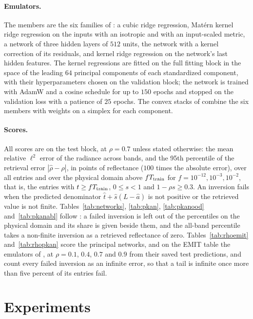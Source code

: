 \documentclass[11pt]{article}
\theoremstyle{remark}
\newcommand{\1}{\mathbf{1}}
\begin{document}
\paragraph{Emulators.} The members are the six families of \cite{shmalo2}: a cubic ridge regression, Mat\'ern kernel
ridge regression on the inputs with an isotropic and with an input-scaled metric, a network of three hidden layers of
$512$ units, the network with a kernel correction of its residuals, and kernel ridge regression on the network's last
hidden features. The kernel regressions are fitted on the full fitting block in the space of the leading $64$
principal components of each standardized component, with their hyperparameters chosen on the validation block; the
network is trained with AdamW and a cosine schedule for up to $150$ epochs and stopped on the validation loss with a
patience of $25$ epochs. The convex stacks of \cite{wolpert,breiman} combine the six members with weights on a simplex
for each component.

\paragraph{Scores.} All scores are on the test block, at $\rho=0.7$ unless stated otherwise: the mean relative $\ell^2$
error of the radiance across bands, and the 95th percentile of the retrieval error $|\hat\rho-\rho|$, in points of
reflectance ($100$ times the absolute error), over all entries and over the physical domain above $fT_{\rm train}$ for
$f=10^{-12},10^{-3},10^{-2}$, that is, the entries with $t\ge fT_{\rm train}$, $0\le s<1$ and $1-\rho s\ge0.3$. An
inversion fails when the predicted denominator $\hat t+\hat s(L-\hat a)$ is not positive or the retrieved value is not
finite. Tables~\ref{tab:networks}, \ref{tab:pkan}, \ref{tab:pkanood} and~\ref{tab:pkanabl} follow \cite{shmalo2}: a
failed inversion is left out of the percentiles on the physical domain and its share is given beside them, and the
all-band percentile takes a non-finite inversion as a retrieved reflectance of zero. Tables~\ref{tab:rhoemit}
and~\ref{tab:rhopkan} score the principal networks, and on the EMIT table the emulators of \cite{shmalo2}, at
$\rho=0.1$, $0.4$, $0.7$ and $0.9$ from their saved test predictions, and count every failed inversion as an infinite
error, so that a tail is infinite once more than five percent of its entries fail.

\section{Experiments}\label{sec:experiments}
\end{document}
